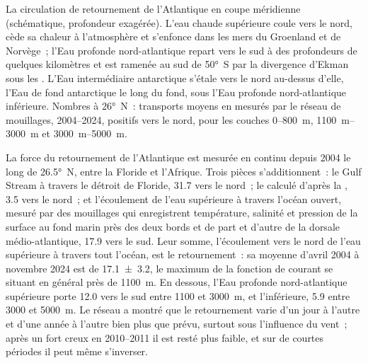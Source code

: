\begin{omfigure}
{\small La circulation de retournement de l'Atlantique en coupe méridienne
(schématique, profondeur exagérée). L'eau chaude supérieure coule vers le nord, cède sa chaleur à
l'atmosphère et s'enfonce dans les mers du Groenland et de Norvège~; l'Eau profonde nord-atlantique
repart vers le sud à des profondeurs de quelques kilomètres et est ramenée au sud de \ang{50}~S par
la divergence d'Ekman sous les . L'Eau intermédiaire antarctique s'étale
vers le nord au-dessus d'elle, l'Eau de fond antarctique le long du fond, sous l'Eau profonde nord-atlantique
inférieure. Nombres à \ang{26}~N~: transports moyens
en  mesurés par le réseau de mouillages, 2004--2024, positifs vers le nord,
pour les couches 0--\qty{800}{m}, \qtyrange{1100}{3000}{m} et
\qtyrange{3000}{5000}{m}.}
\label{fig:b1:ocean-circulation:moc}
\end{omfigure}

La force du retournement de l'Atlantique est mesurée en continu depuis 2004
le long de \ang{26.5}~N, entre la Floride et l'Afrique. Trois pièces s'additionnent~: le Gulf
Stream à travers le détroit de Floride, \qty{31.7}{\sverdrup} vers le nord~; le  calculé d'après la , \qty{3.5}{\sverdrup} vers le nord~; et
l'écoulement de l'eau supérieure à travers l'océan ouvert, mesuré par des mouillages qui enregistrent
température, salinité et pression de la surface au fond marin près des deux
bords et de part et d'autre de la dorsale médio-atlantique, \qty{17.9}{\sverdrup}
vers le sud. Leur somme, l'écoulement vers le nord de l'eau supérieure
à travers tout l'océan, est le retournement~: sa moyenne d'avril 2004 à novembre
2024 est de \qty[uncertainty-mode=separate]{17.1 \pm 3.2}{\sverdrup}, le maximum de la
fonction de courant se situant en général près de \qty{1100}{m}. En dessous, l'Eau profonde nord-atlantique
supérieure porte \qty{12.0}{\sverdrup} vers le sud entre 1100 et \qty{3000}{m}, et
l'inférieure, \qty{5.9}{\sverdrup} entre 3000 et \qty{5000}{m}. Le réseau a montré que le
retournement varie d'un jour à l'autre et d'une année à l'autre bien plus que prévu,
surtout sous l'influence du vent~; après un fort creux en 2010--2011 il est resté
plus faible, et sur de courtes périodes il peut même s'inverser.

